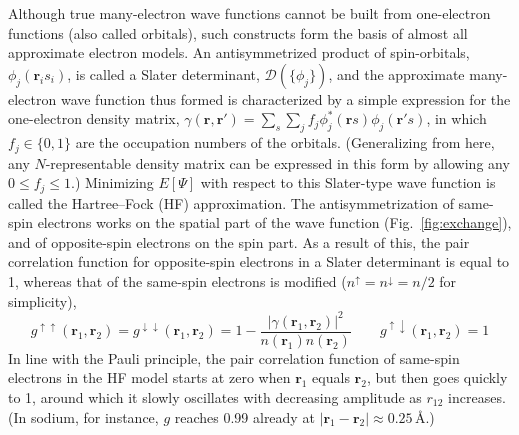 Although true many-electron wave functions cannot be built from one-electron functions (also called orbitals), such constructs form the basis of almost all approximate electron models.
An antisymmetrized product of spin-orbitals, $\phi_j(\mathbf r_i s_i)$, is called a Slater determinant, $\mathcal D(\{\phi_j\})$, and the approximate many-electron wave function thus formed is characterized by a simple expression for the one-electron density matrix, $\gamma(\mathbf r,\mathbf r')=\sum_{s}\sum_j f_j\phi_j^*(\mathbf rs)\phi_j(\mathbf r's)$, in which $f_j\in\{0,1\}$ are the occupation numbers of the orbitals.
(Generalizing from here, any $N$-representable density matrix can be expressed in this form by allowing any $0\leq f_j\leq1$.)
Minimizing $E[\Psi]$ with respect to this Slater-type wave function is called the Hartree--Fock (HF) approximation.
The antisymmetrization of same-spin electrons works on the spatial part of the wave function (Fig.~\ref{fig:exchange}), and of opposite-spin electrons on the spin part.
As a result of this, the pair correlation function for opposite-spin electrons in a Slater determinant is equal to 1, whereas that of the same-spin electrons is modified ($n^\uparrow=n^\downarrow=n/2$ for simplicity),
\begin{equation}
  g^{\uparrow\uparrow}(\mathbf r_1,\mathbf r_2)=g^{\downarrow\downarrow}(\mathbf r_1,\mathbf r_2)=1-\frac{|\gamma(\mathbf r_1,\mathbf r_2)|^2}{n(\mathbf r_1)n(\mathbf r_2)}\qquad
  g^{\uparrow\downarrow}(\mathbf r_1,\mathbf r_2)=1
\end{equation}
In line with the Pauli principle, the pair correlation function of same-spin electrons in the HF model starts at zero when $\mathbf r_1$ equals $\mathbf r_2$, but then goes quickly to 1, around which it slowly oscillates with decreasing amplitude as $r_{12}$ increases.
(In sodium, for instance, $g$ reaches 0.99 already at $|\mathbf r_1-\mathbf r_2|\approx 0.25$\,\AA.)


